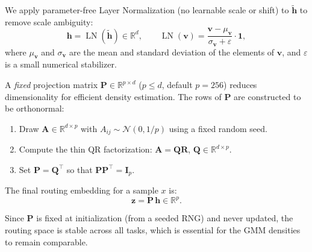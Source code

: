 \documentclass[12pt,a4paper]{article}
\begin{document}
We apply parameter-free Layer Normalization (no learnable scale or shift) to $\tilde{\mathbf{h}}$ to remove scale ambiguity:
\begin{equation}
    \mathbf{h} = \operatorname{LN}(\tilde{\mathbf{h}}) \in \mathbb{R}^{d}, \qquad
    \operatorname{LN}(\mathbf{v}) = \frac{\mathbf{v} - \mu_{\mathbf{v}}}{\sigma_{\mathbf{v}} + \varepsilon} \cdot \mathbf{1},
    \label{eq:ln}
\end{equation}
where $\mu_\mathbf{v}$ and $\sigma_\mathbf{v}$ are the mean and standard deviation of the elements of $\mathbf{v}$, and $\varepsilon$ is a small numerical stabilizer.

A \emph{fixed} projection matrix $\mathbf{P} \in \mathbb{R}^{p \times d}$ ($p \leq d$, default $p=256$) reduces dimensionality for efficient density estimation.
The rows of $\mathbf{P}$ are constructed to be orthonormal:

\begin{enumerate}[noitemsep]
    \item Draw $\mathbf{A} \in \mathbb{R}^{d \times p}$ with $A_{ij} \sim \mathcal{N}(0, 1/p)$ using a fixed random seed.
    \item Compute the thin QR factorization: $\mathbf{A} = \mathbf{Q}\mathbf{R}$, $\mathbf{Q} \in \mathbb{R}^{d \times p}$.
    \item Set $\mathbf{P} = \mathbf{Q}^\top$ so that $\mathbf{P}\mathbf{P}^\top = \mathbf{I}_p$.
\end{enumerate}

The final routing embedding for a sample $x$ is:
\begin{equation}
    \mathbf{z} = \mathbf{P} \, \mathbf{h} \in \mathbb{R}^p.
    \label{eq:z}
\end{equation}

Since $\mathbf{P}$ is fixed at initialization (from a seeded RNG) and never updated, the routing space is stable across all tasks, which is essential for the GMM densities to remain comparable.
\end{document}
